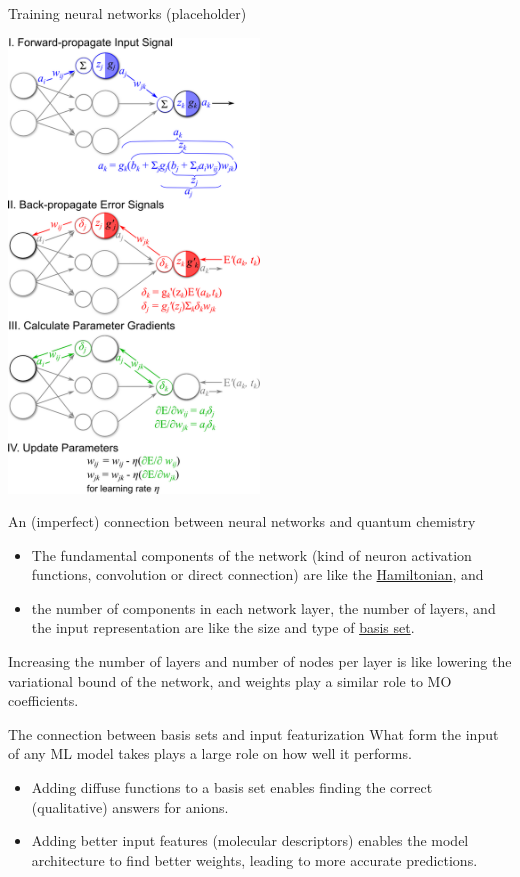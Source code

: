 \documentclass[xetex,compress]{beamer}
\begin{document}
\begin{frame}{Training neural networks (placeholder)}
  \begin{center}
    \includegraphics[width=0.50\textwidth]{./figures/fprop_bprop5.png}
  \end{center}
\end{frame}

\begin{frame}{An (imperfect) connection between neural networks and quantum chemistry}
  \begin{itemize}
  \item The fundamental components of the network (kind of neuron activation functions, convolution or direct connection) are like the \underline{Hamiltonian}, and
  \item the number of components in each network layer, the number of layers, and the input representation are like the size and type of \underline{basis set}.
  \end{itemize}
  Increasing the number of layers and number of nodes per layer is like lowering the variational bound of the network, and weights play a similar role to MO coefficients.
\end{frame}

\begin{frame}{The connection between basis sets and input featurization}
  What form the input of any ML model takes plays a large role on how well it performs.
  \begin{itemize}
  \item Adding diffuse functions to a basis set enables finding the correct (qualitative) answers for anions.
  \item Adding better input features (molecular descriptors) enables the model architecture to find better weights, leading to more accurate predictions.
  \end{itemize}
\end{frame}
\end{document}
